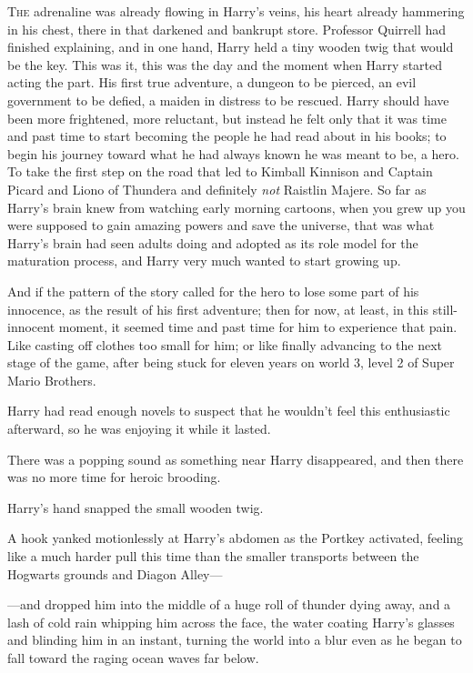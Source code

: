 
\lettrine{T}{he} adrenaline
was already flowing in Harry's veins, his heart already hammering in his chest,
there in that darkened and bankrupt store. Professor Quirrell had finished
explaining, and in one hand, Harry held a tiny wooden twig that would be the
key. This was it, this was the day and the moment when Harry started acting the
part. His first true adventure, a dungeon to be pierced, an evil government to
be defied, a maiden in distress to be rescued. Harry should have been more
frightened, more reluctant, but instead he felt only that it was time and past
time to start becoming the people he had read about in his books; to begin his
journey toward what he had always known he was meant to be, a hero. To take the
first step on the road that led to Kimball Kinnison and Captain Picard and
Liono of Thundera and definitely \emph{not} Raistlin Majere. So far as Harry's
brain knew from watching early morning cartoons, when you grew up you were
supposed to gain amazing powers and save the universe, that was what Harry's
brain had seen adults doing and adopted as its role model for the maturation
process, and Harry very much wanted to start growing up.

And if the pattern of the story called for the hero to lose some part of his
innocence, as the result of his first adventure; then for now, at least, in
this still-innocent moment, it seemed time and past time for him to experience
that pain. Like casting off clothes too small for him; or like finally
advancing to the next stage of the game, after being stuck for eleven years on
world 3, level 2 of Super Mario Brothers.

Harry had read enough novels to suspect that he wouldn't feel this enthusiastic
afterward, so he was enjoying it while it lasted.

There was a popping sound as something near Harry disappeared, and then there
was no more time for heroic brooding.

Harry's hand snapped the small wooden twig.

A hook yanked motionlessly at Harry's abdomen as the Portkey activated, feeling
like a much harder pull this time than the smaller transports between the
Hogwarts grounds and Diagon Alley\mbox{---}

---and dropped him into the middle of a huge roll of thunder dying away, and a
lash of cold rain whipping him across the face, the water coating Harry's
glasses and blinding him in an instant, turning the world into a blur even as
he began to fall toward the raging ocean waves far below.

